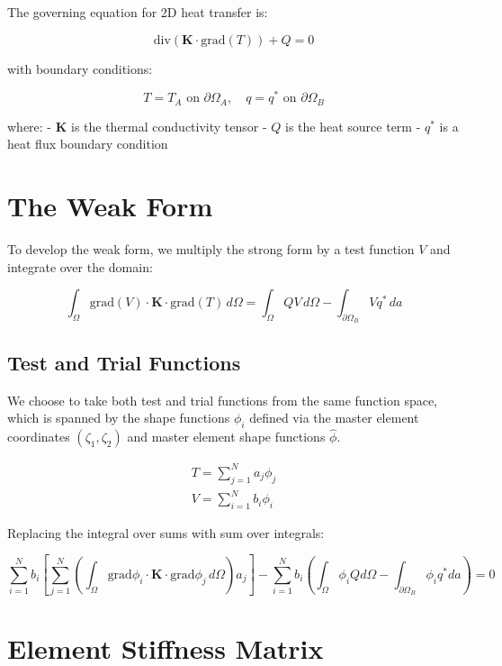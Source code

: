 \documentclass[
  11pt,
  a4paper,
]{scrbook}
\begin{document}
The governing equation for 2D heat transfer is:

\[\text{div}(\mathbf{K} \cdot \text{grad}(T)) + Q = 0\]

with boundary conditions:

\[T=T_A \text{ on } \partial\Omega_A, \quad q=q^* \text{ on } \partial\Omega_B\]

where: - \(\mathbf{K}\) is the thermal conductivity tensor - \(Q\) is
the heat source term - \(q^*\) is a heat flux boundary condition

\section{The Weak Form}\label{the-weak-form-1}

To develop the weak form, we multiply the strong form by a test function
\(V\) and integrate over the domain:

\[\int_{\Omega} \text{grad}(V) \cdot \mathbf{K} \cdot \text{grad}(T) \, d\Omega = \int_{\Omega} Q V \, d\Omega - \int_{\partial\Omega_B}Vq^* \, da\]

\subsection{Test and Trial Functions}\label{test-and-trial-functions}

We choose to take both test and trial functions from the same function
space, which is spanned by the shape functions \({\phi}_i\) defined via
the master element coordinates \((\zeta_1, \zeta_2)\) and master element
shape functions \(\hat{\phi}\).

\[\begin{aligned}
T=\sum_{j=1}^N a_j \phi_j \\
V=\sum_{i=1}^N b_i \phi_i
\end{aligned}\]

Replacing the integral over sums with sum over integrals:

\[\sum_{i=1}^Nb_i\left[ \sum_{j=1}^N \left(\int_{\Omega}\text{grad}{\phi_i} \cdot \mathbf{K} \cdot \text{grad}{\phi_j} \, d\Omega\right) a_j \right]   -\sum_{i=1}^Nb_i\left(\int_{\Omega}\phi_i Q d\Omega -\int_{\partial \Omega_B}\phi_iq^*da\right)=0\]

\section{Element Stiffness Matrix}\label{element-stiffness-matrix}
\end{document}
